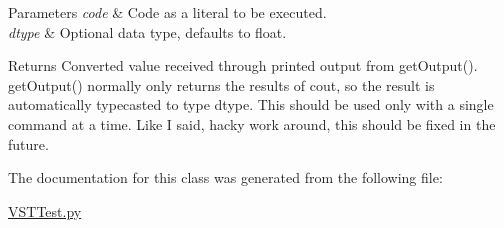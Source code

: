 \begin{DoxyParams}{Parameters}
{\em code} & Code as a literal to be executed. \\
\hline
{\em dtype} & Optional data type, defaults to float. \\
\hline
\end{DoxyParams}
\begin{DoxyReturn}{Returns}
Converted value received through printed output from get\+Output(). get\+Output() normally only returns the results of cout, so the result is automatically typecasted to type dtype. This should be used only with a single command at a time. Like I said, hacky work around, this should be fixed in the future. 
\end{DoxyReturn}


The documentation for this class was generated from the following file\+:\begin{DoxyCompactItemize}
\item 
\hyperlink{_v_s_t_test_8py}{V\+S\+T\+Test.\+py}\end{DoxyCompactItemize}

